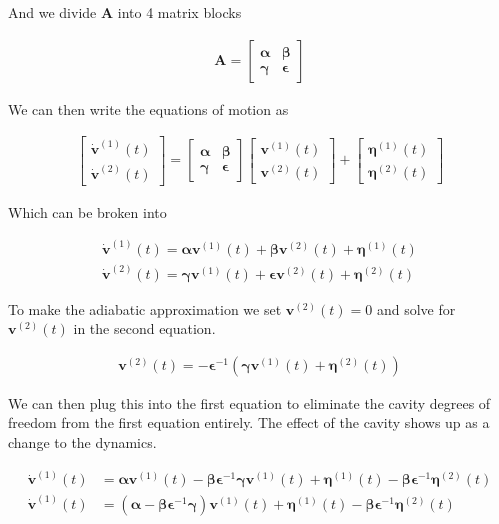 \documentclass[12pt]{article}
\newcommand{\bv}[1]{\boldsymbol{#1}}
\begin{document}
And we divide $\bv{A}$ into 4 matrix blocks

\begin{align}
\bv{A} = 
\begin{bmatrix}
\bv{\alpha} & \bv{\beta}\\
\bv{\gamma} & \bv{\epsilon}
\end{bmatrix}
\end{align}

We can then write the equations of motion as

\begin{align}
\begin{bmatrix}
\dot{\bv{v}}^{(1)}(t)\\
\dot{\bv{v}}^{(2)}(t)
\end{bmatrix} = 
\begin{bmatrix}
\bv{\alpha} & \bv{\beta}\\
\bv{\gamma} & \bv{\epsilon}
\end{bmatrix}
\begin{bmatrix}
\bv{v}^{(1)}(t)\\
\bv{v}^{(2)}(t)
\end{bmatrix}
+ 
\begin{bmatrix}
\bv{\eta}^{(1)}(t)\\
\bv{\eta}^{(2)}(t)
\end{bmatrix}
\end{align}

Which can be broken into

\begin{align}
\dot{\bv{v}}^{(1)}(t) = \bv{\alpha}\bv{v}^{(1)}(t) + \bv{\beta}\bv{v}^{(2)}(t) + \bv{\eta}^{(1)}(t)\\
\dot{\bv{v}}^{(2)}(t) = \bv{\gamma}\bv{v}^{(1)}(t) + \bv{\epsilon}\bv{v}^{(2)}(t) + \bv{\eta}^{(2)}(t)
\end{align}

To make the adiabatic approximation we set $\bv{v}^{(2)}(t)=0$ and solve for $\bv{v}^{(2)}(t)$ in the second equation.

\begin{align}
\bv{v}^{(2)}(t) = -\bv{\epsilon}^{-1}(\bv{\gamma}\bv{v}^{(1)}(t) + \bv{\eta}^{(2)}(t))
\end{align}

We can then plug this into the first equation to eliminate the cavity degrees of freedom from the first equation entirely. The effect of the cavity shows up as a change to the dynamics.

\begin{align}
\dot{\bv{v}}^{(1)}(t) &= \bv{\alpha}\bv{v}^{(1)}(t) - \bv{\beta}\bv{\epsilon}^{-1}\bv{\gamma}\bv{v}^{(1)}(t) + \bv{\eta}^{(1)}(t) - \bv{\beta}\bv{\epsilon}^{-1}\bv{\eta}^{(2)}(t)\\
\dot{\bv{v}}^{(1)}(t) &= (\bv{\alpha} - \bv{\beta}\bv{\epsilon}^{-1}\bv{\gamma})\bv{v}^{(1)}(t) + \bv{\eta}^{(1)}(t) - \bv{\beta}\bv{\epsilon}^{-1}\bv{\eta}^{(2)}(t)
\end{align}
\end{document}

